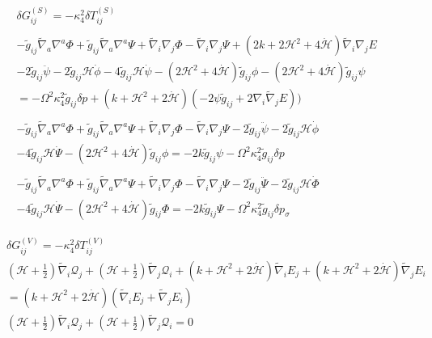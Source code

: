 \documentclass[10pt,letterpaper]{article}
\numberwithin{equation}{section}
\begin{document}
\begin{appendices}
\begin{eqnarray}
&&\delta  G^{(S)}_{ij}=  -\kappa^2_4 \delta T^{(S)}_{ij}
\nonumber\\ \nonumber\\
&& -\tilde g_{ij}\tilde\nabla_a\nabla^a \Phi + \tilde g_{ij} \tilde\nabla_a\nabla^a \Psi + \tilde\nabla_i\nabla_j \Phi - \tilde\nabla_i\nabla_j \Psi
+(2k+2\mathcal H^2 + 4\dot{\mathcal H}) \tilde\nabla_i\nabla_j E \nonumber\\
&&-2 \tilde g_{ij}\ddot \psi -2\tilde g_{ij}\mathcal H \dot\phi - 4\tilde g_{ij}\mathcal H \dot\psi
-(2\mathcal H^2+4\dot{\mathcal H})\tilde g_{ij}\phi -(2\mathcal H^2 +4\dot{\mathcal H})\tilde g_{ij}\psi
\nonumber\\
&& = -\Omega^2 \kappa^2_4 \tilde g_{ij} \delta p + (k+\mathcal H^2 + 2\dot{\mathcal H})(-2\psi \tilde g_{ij} + 2\nabla_i \tilde\nabla_j E ))
\nonumber\\ \nonumber\\
&& -\tilde g_{ij}\tilde\nabla_a\nabla^a \Phi + \tilde g_{ij} \tilde\nabla_a\nabla^a \Psi + \tilde\nabla_i\nabla_j \Phi - \tilde\nabla_i\nabla_j \Psi
-2 \tilde g_{ij}\ddot \psi -2\tilde g_{ij}\mathcal H \dot\phi 
\nonumber\\
&&- 4\tilde g_{ij}\mathcal H \dot\Psi
-(2\mathcal H^2+4\dot{\mathcal H})\tilde g_{ij}\phi =-2k \tilde g_{ij} \psi-\Omega^2 \kappa^2_4 \tilde g_{ij} \delta p
\nonumber\\ \nonumber\\
&& -\tilde g_{ij}\tilde\nabla_a\nabla^a \Phi + \tilde g_{ij} \tilde\nabla_a\nabla^a \Psi + \tilde\nabla_i\nabla_j \Phi - \tilde\nabla_i\nabla_j \Psi
-2 \tilde g_{ij}\ddot \Psi -2\tilde g_{ij}\mathcal H \dot\Phi 
\nonumber\\
&&- 4\tilde g_{ij}\mathcal H \dot\Psi
-(2\mathcal H^2+4\dot{\mathcal H})\tilde g_{ij}\Phi  =-2k \tilde g_{ij} \Psi-\Omega^2 \kappa^2_4 \tilde g_{ij} \delta p_\sigma
\end{eqnarray}

\begin{eqnarray}
&&\delta  G^{(V)}_{ij}=  -\kappa^2_4 \delta T^{(V)}_{ij}
\nonumber\\
&& (\mathcal H+\tfrac{1}{2}) \tilde\nabla_{i}\mathcal Q_{j}
+ (\mathcal H+\tfrac{1}{2}) \tilde\nabla_{j}\mathcal Q_{i}
+(k+\mathcal H^2 + 2\dot{\mathcal H})\tilde\nabla_{i}E_{j} + 
(k+\mathcal H^2 + 2\dot{\mathcal H})\tilde\nabla_{j}E_{i}
\nonumber\\
&&=(k+\mathcal H^2 + 2\dot{\mathcal H})( \tilde\nabla_i E_j + \tilde\nabla_j E_i)
\nonumber\\ 
 &&(\mathcal H+\tfrac{1}{2}) \tilde\nabla_{i}\mathcal Q_{j}
+ (\mathcal H+\tfrac{1}{2}) \tilde\nabla_{j}\mathcal Q_{i}=0
\end{eqnarray}


\end{appendices}
\end{document}
